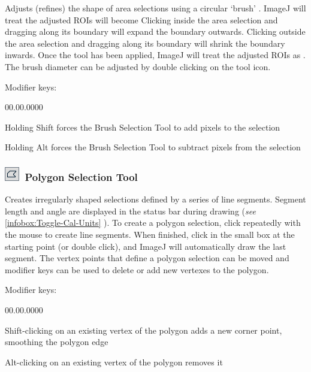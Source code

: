 \noindent Adjusts (refines) the shape of area selections using a circular
`brush' \cite{C-ROIbrush}. ImageJ will treat the adjusted ROIs
will become Clicking inside the area selection and dragging along
its boundary will expand the boundary outwards. Clicking outside the
area selection and dragging along its boundary will shrink the boundary
inwards. Once the tool has been applied, ImageJ will treat the adjusted
ROIs as . The brush diameter can
be adjusted by double clicking on the tool icon.

\noindent Modifier keys:
\begin{lyxlist}{00.00.0000}
\item [{\mykeystroke{Shift}}] \noindent Holding Shift forces the Brush
Selection Tool to add pixels to the selection
\item [{\mykeystroke{Alt}}] \noindent Holding Alt forces the Brush Selection
Tool to subtract pixels from the selection
\end{lyxlist}



\subsubsection[Polygon Selection Too\textsf{l}]{\noindent \textsf{\protect\includegraphics[bb=0bp 5bp 20bp 20bp,scale=0.6]{images/tools/Polygon}}~Polygon
Selection Tool\textsf{\label{sub:Polygon-Selection-Tool}}}

Creates irregularly shaped selections defined by a series of line
segments. Segment length and angle are displayed in the status bar
during drawing (\emph{see} \ref{infobox:Toggle-Cal-Units} ).
To create a polygon selection, click repeatedly with the mouse to
create line segments. When finished, click in the small box at the
starting point (or double click), and ImageJ will automatically draw
the last segment. The vertex points that define a polygon selection
can be moved and modifier keys can be used to delete or add new vertexes
to the polygon. 

Modifier keys:
\begin{lyxlist}{00.00.0000}
\item [{\mykeystroke{Shift}}] \noindent Shift-clicking on an existing
vertex of the polygon adds a new corner point, smoothing the polygon
edge
\item [{\mykeystroke{Alt}}] \noindent Alt-clicking on an existing vertex
of the polygon removes it
\end{lyxlist}

